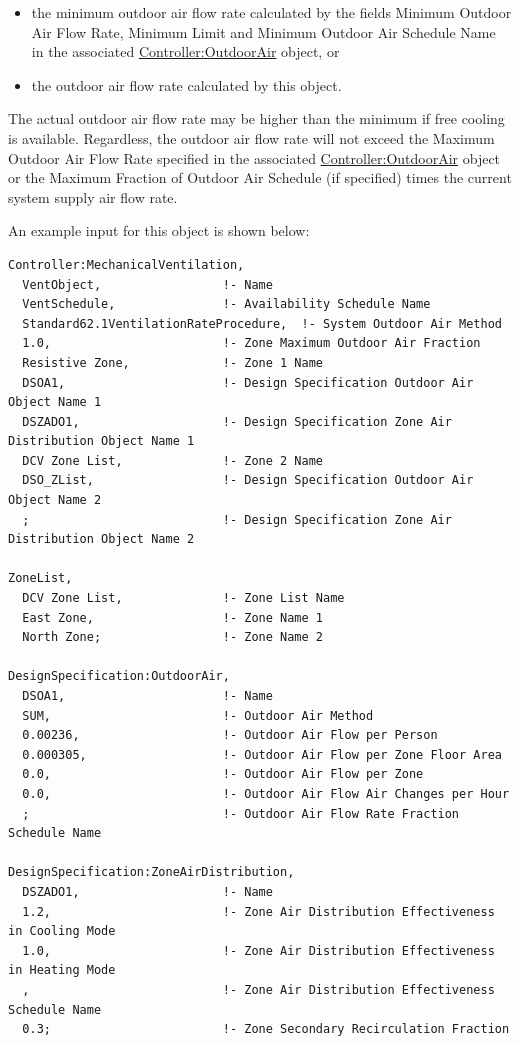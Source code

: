 \begin{itemize}
\item
  the minimum outdoor air flow rate calculated by the fields Minimum Outdoor Air Flow Rate, Minimum Limit and Minimum Outdoor Air Schedule Name in the associated \hyperref[controlleroutdoorair]{Controller:OutdoorAir} object, or
\item
  the outdoor air flow rate calculated by this object.
\end{itemize}

The actual outdoor air flow rate may be higher than the minimum if free cooling is available. Regardless, the outdoor air flow rate will not exceed the Maximum Outdoor Air Flow Rate specified in the associated \hyperref[controlleroutdoorair]{Controller:OutdoorAir} object or the Maximum Fraction of Outdoor Air Schedule (if specified) times the current system supply air flow rate.

An example input for this object is shown below:

\begin{lstlisting}
Controller:MechanicalVentilation,
  VentObject,                 !- Name
  VentSchedule,               !- Availability Schedule Name
  Standard62.1VentilationRateProcedure,  !- System Outdoor Air Method
  1.0,                        !- Zone Maximum Outdoor Air Fraction
  Resistive Zone,             !- Zone 1 Name
  DSOA1,                      !- Design Specification Outdoor Air Object Name 1
  DSZADO1,                    !- Design Specification Zone Air Distribution Object Name 1
  DCV Zone List,              !- Zone 2 Name
  DSO_ZList,                  !- Design Specification Outdoor Air Object Name 2
  ;                           !- Design Specification Zone Air Distribution Object Name 2

ZoneList,
  DCV Zone List,              !- Zone List Name
  East Zone,                  !- Zone Name 1
  North Zone;                 !- Zone Name 2

DesignSpecification:OutdoorAir,
  DSOA1,                      !- Name
  SUM,                        !- Outdoor Air Method
  0.00236,                    !- Outdoor Air Flow per Person
  0.000305,                   !- Outdoor Air Flow per Zone Floor Area
  0.0,                        !- Outdoor Air Flow per Zone
  0.0,                        !- Outdoor Air Flow Air Changes per Hour
  ;                           !- Outdoor Air Flow Rate Fraction Schedule Name

DesignSpecification:ZoneAirDistribution,
  DSZADO1,                    !- Name
  1.2,                        !- Zone Air Distribution Effectiveness in Cooling Mode
  1.0,                        !- Zone Air Distribution Effectiveness in Heating Mode
  ,                           !- Zone Air Distribution Effectiveness Schedule Name
  0.3;                        !- Zone Secondary Recirculation Fraction
\end{lstlisting}

